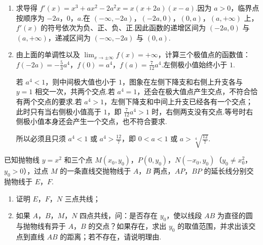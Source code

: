\begin{solution}
\begin{enumerate}
\item 求导得 \(f'(x)=x^3+ax^2-2a^2x=x(x+2a)(x-a)\).因为 \(a>0\)，临界点按顺序为 \(-2a\)，\(0\)，\(a\).在 \((-\infty,-2a)\)，\((-2a,0)\)，\((0,a)\)，\((a,+\infty)\) 上，\(f'(x)\) 的符号依次为负、正、负、正.因此函数的递增区间为 \((-2a,0)\) 与 \((a,+\infty)\)，递减区间为 \((-\infty,-2a)\) 与 \((0,a)\).
\item 由上面的单调性以及 \(\lim_{x\to\pm\infty}f(x)=+\infty\)，计算三个极值点的函数值：\(f(-2a)=-\frac53a^4\)，\(f(0)=a^4\)，\(f(a)=\frac7{12}a^4\).左侧极小值始终小于 \(1\).

若 \(a^4<1\)，则中间极大值也小于 \(1\)，图象在左侧下降支和右侧上升支各与 \(y=1\) 相交一次，共两个交点.若 \(a^4=1\)，还会在极大值点产生交点，不符合恰有两个交点的要求.若 \(a^4>1\)，左侧下降支和中间上升支已经各有一个交点；此时只有当右侧极小值高于 \(1\)，即 \(\frac7{12}a^4>1\) 时，右侧两支没有交点.等号时右侧极小值本身还会产生一个交点，也不符合要求.

所以必须且只须 \(a^4<1\) 或 \(a^4>\frac{12}{7}\)，即 \(0<a<1\) 或 \(a>\sqrt[4]{\frac{12}{7}}\).
\end{enumerate}
\end{solution}

\begin{problem}
已知抛物线 \(y = x^2\) 和三个点 \(M(x_0, y_0)\)，\(P(0, y_0)\)，\(N(-x_0, y_0)\)（\(y_0 \neq x_0^2\)，\(y_0 > 0\)），过点 \(M\) 的一条直线交抛物线于 \(A\)，\(B\) 两点，\(AP\)，\(BP\) 的延长线分别交抛物线于 \(E\)，\(F\).

\begin{enumerate}
\item 证明 \(E\)，\(F\)，\(N\) 三点共线；
\item 如果 \(A\)，\(B\)，\(M\)，\(N\) 四点共线，问：是否存在 \(y_0\)，使以线段 \(AB\) 为直径的圆与抛物线有异于 \(A\)，\(B\) 的交点？如果存在，求出 \(y_0\) 的取值范围，并求出该交点到直线 \(AB\) 的距离；若不存在，请说明理由.
\end{enumerate}

\end{problem}


